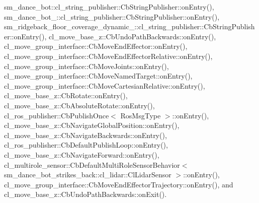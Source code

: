 sm\+\_\+dance\+\_\+bot\+::cl\+\_\+string\+\_\+publisher\+::\+Cb\+String\+Publisher\+::on\+Entry(), sm\+\_\+dance\+\_\+bot\+\_\+::cl\+\_\+string\+\_\+publisher\+::\+Cb\+String\+Publisher\+::on\+Entry(), sm\+\_\+ridgeback\+\_\+floor\+\_\+coverage\+\_\+dynamic\+\_\+::cl\+\_\+string\+\_\+publisher\+::\+Cb\+String\+Publisher\+::on\+Entry(), cl\+\_\+move\+\_\+base\+\_\+z\+::\+Cb\+Undo\+Path\+Backwards\+::on\+Entry(), cl\+\_\+move\+\_\+group\+\_\+interface\+::\+Cb\+Move\+End\+Effector\+::on\+Entry(), cl\+\_\+move\+\_\+group\+\_\+interface\+::\+Cb\+Move\+End\+Effector\+Relative\+::on\+Entry(), cl\+\_\+move\+\_\+group\+\_\+interface\+::\+Cb\+Move\+Joints\+::on\+Entry(), cl\+\_\+move\+\_\+group\+\_\+interface\+::\+Cb\+Move\+Named\+Target\+::on\+Entry(), cl\+\_\+move\+\_\+group\+\_\+interface\+::\+Cb\+Move\+Cartesian\+Relative\+::on\+Entry(), cl\+\_\+move\+\_\+base\+\_\+z\+::\+Cb\+Rotate\+::on\+Entry(), cl\+\_\+move\+\_\+base\+\_\+z\+::\+Cb\+Absolute\+Rotate\+::on\+Entry(), cl\+\_\+ros\+\_\+publisher\+::\+Cb\+Publish\+Once$<$ Ros\+Msg\+Type $>$\+::on\+Entry(), cl\+\_\+move\+\_\+base\+\_\+z\+::\+Cb\+Navigate\+Global\+Position\+::on\+Entry(), cl\+\_\+move\+\_\+base\+\_\+z\+::\+Cb\+Navigate\+Backwards\+::on\+Entry(), cl\+\_\+ros\+\_\+publisher\+::\+Cb\+Default\+Publish\+Loop\+::on\+Entry(), cl\+\_\+move\+\_\+base\+\_\+z\+::\+Cb\+Navigate\+Forward\+::on\+Entry(), cl\+\_\+multirole\+\_\+sensor\+::\+Cb\+Default\+Multi\+Role\+Sensor\+Behavior$<$ sm\+\_\+dance\+\_\+bot\+\_\+strikes\+\_\+back\+::cl\+\_\+lidar\+::\+Cl\+Lidar\+Sensor $>$\+::on\+Entry(), cl\+\_\+move\+\_\+group\+\_\+interface\+::\+Cb\+Move\+End\+Effector\+Trajectory\+::on\+Entry(), and cl\+\_\+move\+\_\+base\+\_\+z\+::\+Cb\+Undo\+Path\+Backwards\+::on\+Exit().


